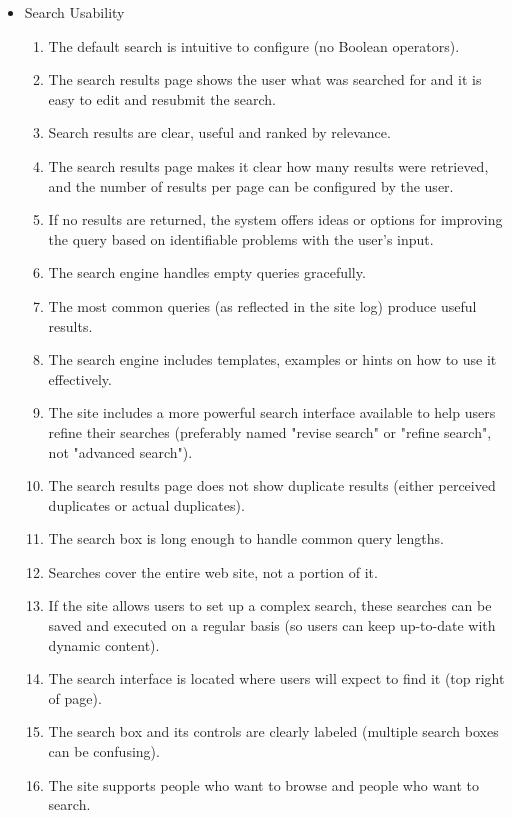 \begin{itemize}
\begin{enumerate}
      \end{enumerate}
  \item Search Usability
      \begin{enumerate}
        \item The default search is intuitive to configure (no Boolean operators).
        \item The search results page shows the user what was searched for and it is easy to edit and resubmit the search.
        \item Search results are clear, useful and ranked by relevance.
        \item The search results page makes it clear how many results were retrieved, and the number of results per page can be configured by the user.
        \item If no results are returned, the system offers ideas or options for improving the query based on identifiable problems with the user's input.
        \item The search engine handles empty queries gracefully.
        \item The most common queries (as reflected in the site log) produce useful results.
        \item The search engine includes templates, examples or hints on how to use it effectively.
        \item The site includes a more powerful search interface available to help users refine their searches (preferably named "revise search" or "refine search", not "advanced search").
        \item The search results page does not show duplicate results (either perceived duplicates or actual duplicates).
        \item The search box is long enough to handle common query lengths.
        \item Searches cover the entire web site, not a portion of it.
        \item If the site allows users to set up a complex search, these searches can be saved and executed on a regular basis (so users can keep up-to-date with dynamic content).
        \item The search interface is located where users will expect to find it (top right of page).
        \item The search box and its controls are clearly labeled (multiple search boxes can be confusing).
        \item The site supports people who want to browse and people who want to search.

\end{enumerate}
\end{itemize}
